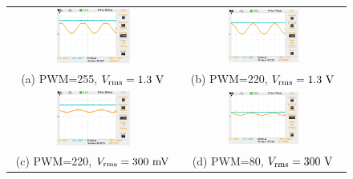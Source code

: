 \documentclass[12pt]{article}
\begin{document}
\begin{figure}[htbp]
\begin{center}
\begin{tabular}{cc}
{\includegraphics[width=0.45\textwidth]{figs/pwm255_1_3Vrms.JPG}} &
{\includegraphics[width=0.45\textwidth]{figs/pwm220_1_3Vrms.JPG}} \\
(a) PWM=255, $V_{\rm rms}=1.3~\rm V$ & (b) PWM=220, $V_{\rm rms}=1.3~\rm V$ \\
{\includegraphics[width=0.45\textwidth]{figs/pwm220_300mVrms.JPG}} &
{\includegraphics[width=0.45\textwidth]{figs/pwm80_300mVrms.JPG}} \\
(c) PWM=220, $V_{\rm rms}=300~\rm mV$ & (d) PWM=80, $V_{\rm rms}=300~\rm V$ \\

\end{tabular}
\end{center}
\end{figure}
\end{document}
